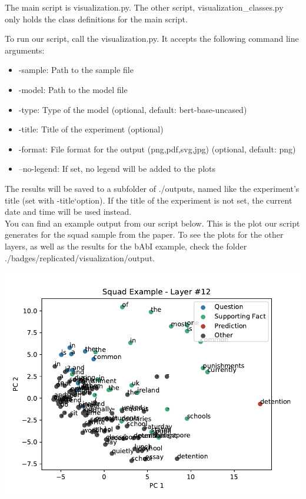 \documentclass{article}
\begin{document}
	The main script is visualization.py. The other script, visualization\_classes.py only holds the class definitions for the main script.
	
	To run our script, call the visualization.py. It accepts the following command line arguments:
	
	\begin{itemize}
		\item -sample: Path to the sample file
		\item -model: Path to the model file
		\item -type: Type of the model (optional, default: bert-base-uncased)
		\item -title: Title of the experiment (optional)
		\item -format: File format for the output (png,pdf,svg,jpg) (optional, default: png)
		\item --no-legend: If set, no legend will be added to the plots
	\end{itemize}

	The results will be saved to a subfolder of ./outputs, named like the experiment's title (set with -title`option). If the title of the experiment is not set, the current date and time will be used instead.\\

	
	You can find an example output from our script below. This is the plot our script generates for the squad sample from the paper. To see the plots for the other layers, as well as the results for the bAbI example, check the folder ./badges/replicated/visualization/output.
	
	\begin{center}
		\includegraphics[scale=0.6]{../badges/replicated/visualization/output/squad-example/layer-12.pdf}
	\end{center}
	
\end{document}
